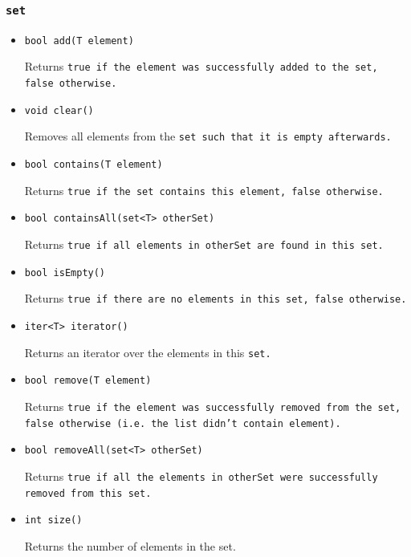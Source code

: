 \documentclass{article}
\begin{document}

\subsubsection{\tt set \rm} %
\label{ssub:tt_set_rm}

\begin{itemize}

\item[] \tt bool add(T element) \rm

Returns \tt true \rm if the element was successfully added to the \tt set\rm, \tt false \rm otherwise.

\item[] \tt void clear() \rm

Removes all elements from the \tt set \rm such that it is empty afterwards.

\item[] \tt bool contains(T element) \rm

Returns \tt true \rm if the \tt set \rm contains this element, \tt false \rm otherwise.

\item[] \tt bool containsAll(set<T> otherSet) \rm

Returns \tt true \rm if all elements in \tt otherSet \rm are found in this set.

\item[] \tt bool isEmpty() \rm

Returns \tt true \rm if there are no elements in this \tt set\rm, \tt false \rm otherwise.

\item[] \tt iter<T> iterator() \rm

Returns an iterator over the elements in this \tt set\rm.

\item[] \tt bool remove(T element) \rm

Returns \tt true \rm if the element was successfully removed from the \tt set\rm, \tt false \rm otherwise (i.e. the \tt list
\rm didn't contain \tt element\rm).

\item[] \tt bool removeAll(set<T> otherSet) \rm

Returns \tt true \rm if all the elements in \tt otherSet \rm were successfully removed from this set.

\item[] \tt int size() \rm

Returns the number of elements in the set.

\end{itemize}
\end{document}
